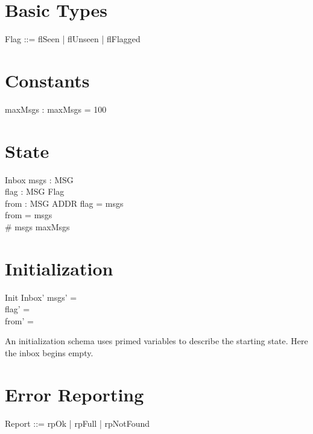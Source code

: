 \documentclass{article}
\begin{document}
\section{Basic Types}

\begin{zed}
\end{zed}

\begin{zed}
  Flag ::= flSeen | flUnseen | flFlagged
\end{zed}

\section{Constants}

\begin{axdef}
  maxMsgs : \nat
\where
  maxMsgs = 100
\end{axdef}

\section{State}

\begin{schema}{Inbox}
  msgs : \power MSG \\
  flag : MSG \pfun Flag \\
  from : MSG \pfun ADDR
\where
  \dom flag = msgs \\
  \dom from = msgs \\
  \# msgs \leq maxMsgs
\end{schema}

\section{Initialization}

\begin{schema}{Init}
  Inbox'
\where
  msgs' = \emptyset \\
  flag' = \emptyset \\
  from' = \emptyset
\end{schema}

An initialization schema uses primed variables to describe
the starting state. Here the inbox begins empty.

\section{Error Reporting}

\begin{zed}
  Report ::= rpOk | rpFull | rpNotFound
\end{zed}
\end{document}
